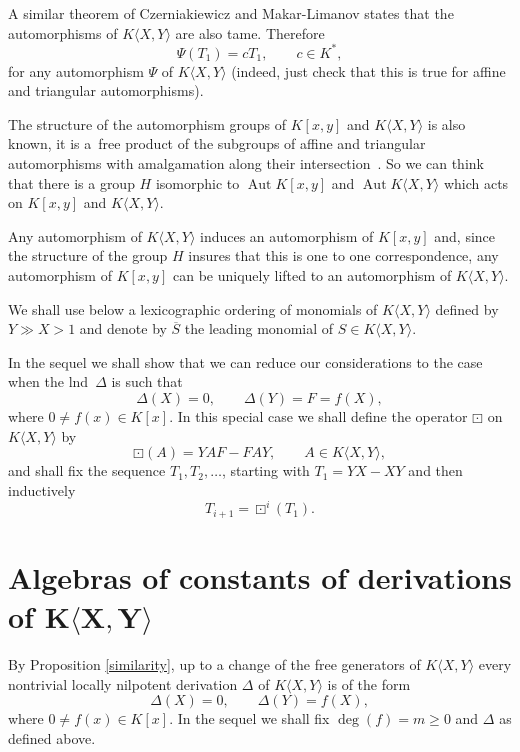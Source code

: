 \documentclass[11pt]{article}
\numberwithin{equation}{section}
\begin{document}
A similar theorem of Czerniakiewicz \cite{Cz1, Cz2} and Makar-Limanov \cite{ML} states that the automorphisms of $K\langle X,Y\rangle$ are also tame. Therefore
\[
\Psi(T_1) = cT_1, \qquad c \in K^{\ast},
\]
for any automorphism $\Psi$ of $K\langle X,Y\rangle$ (indeed, just check that this is true for affine and triangular automorphisms).

The structure of the automorphism groups of $K[x, y]$ and $K\langle X,Y\rangle$ is also known, it is a~free product of the subgroups of affine and triangular automorphisms with amalgamation along their intersection~\cite{Se}. So we can think that there is a group $H$ isomorphic to $\operatorname{Aut}K[x,y]$ and $\operatorname{Aut}K\langle X,Y\rangle$ which acts on $K[x, y]$ and $K\langle X,Y\rangle$.

Any automorphism of $K\langle X,Y\rangle$ induces an automorphism of $K[x, y]$ and, since the structure of the group $H$ insures that this is one to one correspondence, any automorphism of $K[x,y]$ can be uniquely lifted to an automorphism of $K\langle X,Y\rangle$.

We shall use below a lexicographic ordering of monomials of $K\langle X,Y\rangle$ defined by $Y\gg X > 1$ and denote by $\overline{S}$ the leading monomial of $S \in K\langle X,Y\rangle$.

In the sequel we shall show that we can reduce our considerations to the case when the lnd~$\Delta$ is such that
\[
\Delta(X)=0,\qquad \Delta(Y)=F=f(X),
\]
where $0\not=f(x)\in K[x]$. In this special case we shall define the operator $\boxdot$ on $K\langle X,Y\rangle$ by
\[
\boxdot(A)= YAF - FAY,\qquad A\in K\langle X,Y\rangle,
\]
and shall fix the sequence $T_1,T_2,\ldots$, starting with $T_1= YX - XY$ and then inductively
\[
T_{i+1} = \boxdot^i(T_1).
\]


\setcounter{section}{3}
\setcounter{subsection}{0}
\setcounter{subsubsection}{0}
\setcounter{Theorem}{3}
\setcounter{equation}{0}
\section[Algebras of constants of derivations of $K\langle X,Y\rangle$]{Algebras of constants of derivations of $\boldsymbol{K\langle X,Y\rangle}$}

By Proposition \ref{similarity}, up to a change of the free generators of $K\langle X,Y\rangle$ every nontrivial locally nilpotent derivation $\Delta$ of $K\langle X,Y\rangle$ is of the form
\[
\Delta(X)=0,\qquad \Delta(Y)=f(X),
\]
where $0\not=f(x)\in K[x]$. In the sequel we shall fix $\deg(f)=m\geq 0$ and $\Delta$ as defined above.
\end{document}
